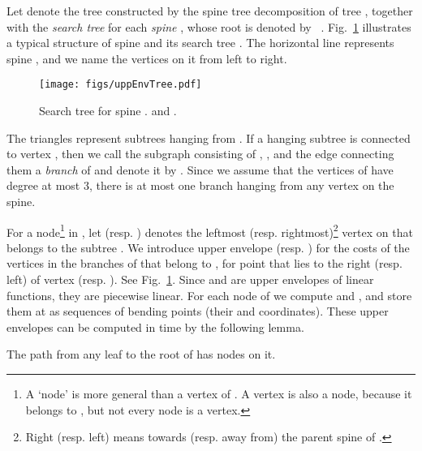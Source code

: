 \documentclass{llncs}
\newcommand{\QED}{\hfill}
\begin{document}
{Let  denote the tree constructed by the spine tree decomposition of tree ,
together with the {\em search tree}  for each {\em spine} ,
whose root is denoted by ~\cite{benkoczi2004,benkoczi2003}.
Fig.~\ref{fig:uppEnvTree}  illustrates a typical structure of spine  and
its search tree .
The horizontal line represents spine ,
and we name the vertices on it   from left to right. 
\begin{figure}[ht]
\centering
\texttt{[image: figs/uppEnvTree.pdf]}
\caption{Search tree  for spine .
 and . 
}
\label{fig:uppEnvTree}
\end{figure}
The triangles represent subtrees hanging from .
If a hanging subtree  is connected to vertex ,
then we call the subgraph consisting of , , and the edge connecting them a {\em branch}
of  and denote it by .
Since we assume that the vertices of  have degree at most 3,
there is at most one branch hanging from any vertex on the spine.
 
For a node\footnote{A `node' is more general than a vertex of .
A vertex is also a node, because it belongs to ,
but not every node is a vertex.}
 in ,
let  (resp. ) denotes the leftmost
(resp. rightmost)\footnote{Right (resp. left) means towards (resp. away from)
the parent spine  of .}
 vertex on  that belongs to the subtree .
We introduce upper envelope  (resp. )
for the costs
of the vertices in the branches of  that belong to ,
for point  that lies to the right (resp. left) of vertex  (resp. ). 
See Fig.~\ref{fig:uppEnvTree}.
Since  and  are upper envelopes of linear functions,
they are piecewise linear.
For each node  of  we compute  and ,
and store them at  as sequences of bending points
(their  and  coordinates).
These upper envelopes can be computed in  time
by the following lemma.
\begin{lemma}\label{lem:std}{\rm \cite{benkoczi2004,benkoczi2003}}
The path from any leaf to the root of  has  nodes on it.
\QED
\end{lemma}

}
\end{document}
